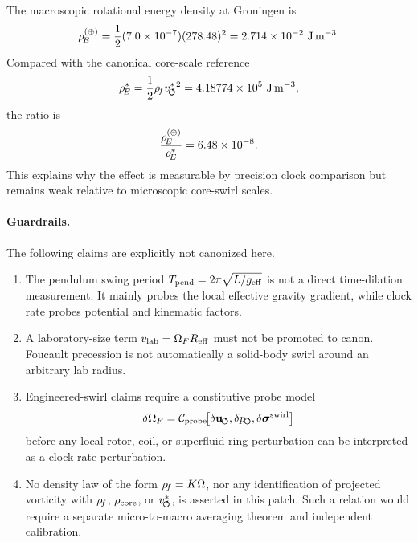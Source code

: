 The macroscopic rotational energy density at Groningen is
\begin{align}
    \rho_{\!E}^{(\oplus)}
    =
    \frac12(7.0\times10^{-7})(278.48)^2
    =
    2.714\times10^{-2}\ {\rm J\,m^{-3}}.
\end{align}
Compared with the canonical core-scale reference
\begin{align}
    \rho_{\!E}^{\ast}
    =
    \frac12\rho_{\!f}v_{\!\boldsymbol{\circlearrowleft}}^{\ast}{}^2
    =
    4.18774\times10^5\ {\rm J\,m^{-3}},
\end{align}
the ratio is
\begin{align}
    \frac{\rho_{\!E}^{(\oplus)}}{\rho_{\!E}^{\ast}}
    =
    6.48\times10^{-8}.
\end{align}
This explains why the effect is measurable by precision clock comparison but remains weak relative to microscopic core-swirl scales.

\paragraph{Guardrails.}
The following claims are explicitly not canonized here.
\begin{enumerate}
    \item The pendulum swing period $T_{\rm pend}=2\pi\sqrt{L/g_{\rm eff}}$ is not a direct time-dilation measurement.  It mainly probes the local effective gravity gradient, while clock rate probes potential and kinematic factors.
    \item A laboratory-size term $v_{\rm lab}=\Omega_F R_{\rm eff}$ must not be promoted to canon.  Foucault precession is not automatically a solid-body swirl around an arbitrary lab radius.
    \item Engineered-swirl claims require a constitutive probe model
    \begin{align}
        \delta\Omega_F
        =
        \mathcal{C}_{\rm probe}
        \!\big[
        \delta\mathbf{u}_{\!\boldsymbol{\circlearrowleft}},
        \delta p_{\!\boldsymbol{\circlearrowleft}},
        \delta\boldsymbol{\sigma}^{\rm swirl}
        \big]
    \end{align}
    before any local rotor, coil, or superfluid-ring perturbation can be interpreted as a clock-rate perturbation.
    \item No density law of the form $\rho_{\!f}=K\Omega$, nor any identification of projected vorticity with $\rho_{\!f}$, $\rho_{\rm core}$, or $v_{\!\boldsymbol{\circlearrowleft}}^{\ast}$, is asserted in this patch.  Such a relation would require a separate micro-to-macro averaging theorem and independent calibration.
\end{enumerate}

